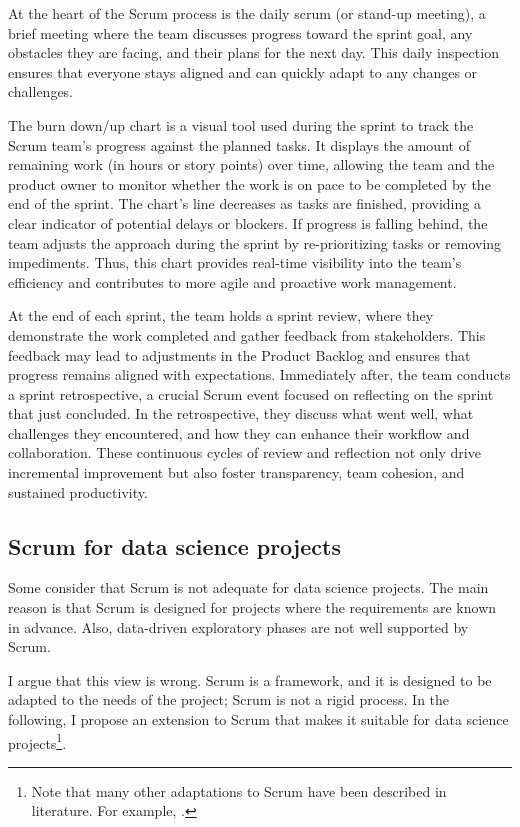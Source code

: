 At the heart of the Scrum process is the daily scrum (or stand-up meeting), a brief
meeting where the team discusses progress toward the sprint goal, any obstacles they are
facing, and their plans for the next day. This daily inspection ensures that everyone
stays aligned and can quickly adapt to any changes or challenges\nocite{cobb2015scrum}.

The burn down/up chart is a visual tool used during the sprint to track the Scrum
team's progress against the planned tasks. It displays the amount of remaining work (in
hours or story points) over time, allowing the team and the product owner to monitor
whether the work is on pace to be completed by the end of the sprint. The chart's line
decreases as tasks are finished, providing a clear indicator of potential delays or
blockers. If progress is falling behind, the team adjusts the approach during the
sprint by re-prioritizing tasks or removing impediments. Thus, this chart provides
real-time visibility into the team’s efficiency and contributes to more agile and
proactive work management.

At the end of each sprint, the team holds a sprint review, where they demonstrate the work
completed and gather feedback from stakeholders. This feedback may lead to adjustments in
the Product Backlog and ensures that progress remains aligned with expectations.
Immediately after, the team conducts a sprint retrospective, a crucial Scrum event focused
on reflecting on the sprint that just concluded. In the retrospective, they discuss what
went well, what challenges they encountered, and how they can enhance their workflow and
collaboration. These continuous cycles of review and reflection not only drive incremental
improvement but also foster transparency, team cohesion, and sustained productivity.
\nocite{rubin2012sprints}

\subsection{Scrum for data science projects}

Some consider that Scrum is not adequate for data science projects.  The main reason is
that Scrum is designed for projects where the requirements are known in advance.  Also,
data-driven exploratory phases are not well supported by Scrum.

I argue that this view is wrong.  Scrum is a framework, and it is designed to be adapted to
the needs of the project;  Scrum is not a rigid process.  In the following, I propose an
extension to Scrum that makes it suitable for data science projects\footnote{Note that
many other adaptations to Scrum have been described in literature.  For example,
.}.

